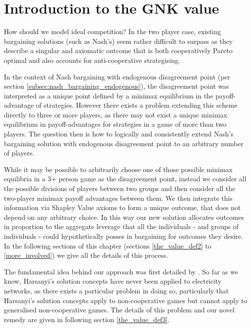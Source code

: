 \section{Introduction to the GNK value}\label{sec:prelude_gnk}\label{sec:introduction_gnk_sec}


How should we model ideal competition? In the two player case, existing bargaining solutions (such as Nash's) seem rather difficult to surpass as they describe a singular and axiomatic outcome that is both cooperatively Pareto optimal and also accounts for anti-cooperative strategising.

In the context of Nash bargaining with endogenous disagreement point (per section \ref{subsec:nash_bargaining_endogenous}), the disagreement point was interpreted as a unique point defined by a minimax equilibrium in the payoff-advantage of strategies.
However there exists a problem extending this scheme directly to three or more players, as there may not exist a unique minimax equilibrium in payoff-advantages for strategies in a game of more than two players.
The question then is how to logically and consistently extend Nash's bargaining solution with endogenous disagreement point to an arbitrary number of players.

While it may be possible to arbitrarily choose one of those possible minimax equilibria in a 3+ person game as the disagreement point, 
instead we consider all the possible divisions of players between two groups and then consider all the two-player minimax payoff advantages between them. We then integrate this information via Shapley Value axioms to form a unique outcome, that does not depend on any arbitrary choice.
In this way our new solution allocates outcomes in proportion to the aggregate leverage that all the individuals - and groups of individuals - could hypothetically posses in bargaining for outcomes they desire.
In the following sections of this chapter (sections \ref{the_value_def2} to \ref{more_involved}) we give all the details of this process.%

The fundamental idea behind our approach was first detailed by \cite{values3}.
So far as we know, Harsanyi's solution concepts have never been applied to electricity networks, as there exists a particular problem in doing so, particularly that Harsanyi's solution concepts apply to non-cooperative games but cannot apply to generalised non-cooperative games.
The details of this problem and our novel remedy are given in following section \ref{the_value_def3}.

